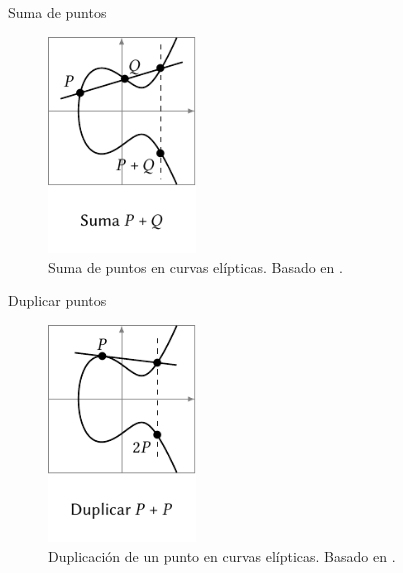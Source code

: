 \documentclass[spanish]{beamer}
\begin{document}
\begin{frame}{Suma de puntos}
  \begin{figure}[h]
    \centering
    \includegraphics[width=0.35\textwidth]{img/suma-curvas}
    \caption{Suma de puntos en curvas elípticas. Basado en  \parencite{eichlseder_elliptic_2016}.}
    \label{fig:suma-curvas}
  \end{figure}  
\end{frame}

\begin{frame}{Duplicar puntos}
  \begin{figure}[h]
    \centering
    \includegraphics[width=0.35\textwidth]{img/duplicar-curvas}
    \caption{Duplicación de un punto en curvas elípticas. Basado en  \parencite{eichlseder_elliptic_2016}.}
    \label{fig:duplicar-curvas}
  \end{figure}  
\end{frame}

\end{document}
